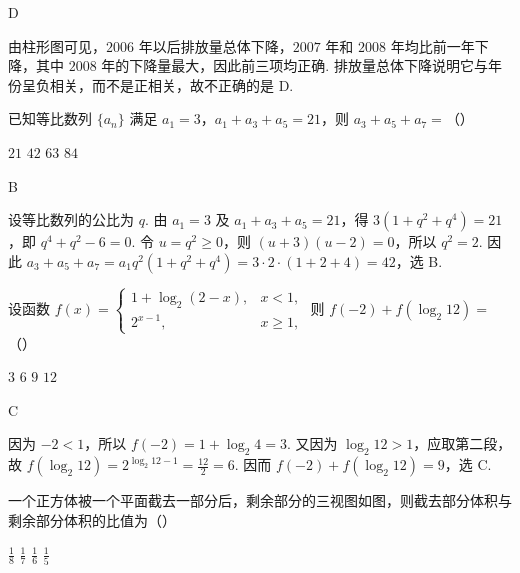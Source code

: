 \begin{answer}
D
\end{answer}

\begin{solution}
由柱形图可见，\(2006\) 年以后排放量总体下降，\(2007\) 年和 \(2008\) 年均比前一年下降，其中 \(2008\) 年的下降量最大，因此前三项均正确. 排放量总体下降说明它与年份呈负相关，而不是正相关，故不正确的是 D.
\end{solution}

\begin{problem}
已知等比数列 \(\{a_n\}\) 满足 \(a_1=3\)，\(a_1+a_3+a_5=21\)，则 \(a_3+a_5+a_7=\)（\quad）

\choices
    {\(21\)}
    {\(42\)}
    {\(63\)}
    {\(84\)}
\end{problem}

\begin{answer}
B
\end{answer}

\begin{solution}
设等比数列的公比为 \(q\). 由 \(a_1=3\) 及 \(a_1+a_3+a_5=21\)，得 \(3(1+q^2+q^4)=21\)，即 \(q^4+q^2-6=0\). 令 \(u=q^2\geqslant0\)，则 \((u+3)(u-2)=0\)，所以 \(q^2=2\). 因此 \(a_3+a_5+a_7=a_1q^2(1+q^2+q^4)=3\cdot2\cdot(1+2+4)=42\)，选 B.
\end{solution}

\begin{problem}
设函数 \(f(x)=\begin{cases}
1+\log_2(2-x), & x<1,\\
2^{x-1}, & x\geqslant 1,
\end{cases}\) 则 \(f(-2)+f(\log_2 12)=\)（\quad）

\choices
    {\(3\)}
    {\(6\)}
    {\(9\)}
    {\(12\)}
\end{problem}

\begin{answer}
C
\end{answer}

\begin{solution}
因为 \(-2<1\)，所以 \(f(-2)=1+\log_2 4=3\). 又因为 \(\log_2 12>1\)，应取第二段，故 \(f(\log_2 12)=2^{\log_2 12-1}=\frac{12}{2}=6\). 因而 \(f(-2)+f(\log_2 12)=9\)，选 C.
\end{solution}

\begin{problem}
一个正方体被一个平面截去一部分后，剩余部分的三视图如图，则截去部分体积与剩余部分体积的比值为（\quad）

\FloatBarrier

\choices
    {\(\frac{1}{8}\)}
    {\(\frac{1}{7}\)}
    {\(\frac{1}{6}\)}
    {\(\frac{1}{5}\)}
\end{problem}

